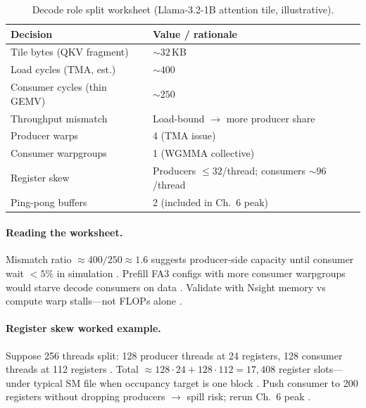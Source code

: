\begin{table}[t]
\centering
\small
\caption{Decode role split worksheet (Llama-3.2-1B attention tile, illustrative).}
\label{tab:ch07_role_worked_example}
\begin{tabular}{@{}ll@{}}
\toprule
\textbf{Decision} & \textbf{Value / rationale} \\
\midrule
Tile bytes (QKV fragment) & ${\sim}32$\,KB \\
Load cycles (TMA, est.) & ${\sim}400$ \\
Consumer cycles (thin GEMV) & ${\sim}250$ \\
Throughput mismatch & Load-bound $\rightarrow$ more producer share \\
Producer warps & 4 (TMA issue) \\
Consumer warpgroups & 1 (WGMMA collective) \\
Register skew & Producers ${\le}32$/thread; consumers ${\sim}96$/thread \\
Ping-pong buffers & 2 (included in Ch.~6 peak) \\
\bottomrule
\end{tabular}
\end{table}

\paragraph{Reading the worksheet.}
Mismatch ratio ${\approx}400/250 \approx 1.6$ suggests producer-side capacity until consumer wait $\lt 5\%$ in simulation \citep{shah2024flashattention3,patel2025llminference}.
Prefill FA3 configs with more consumer warpgroups would starve decode consumers on data \citep{shah2024flashattention3,taxbreak2026}.
Validate with Nsight memory vs compute warp stalls---not FLOPs alone \citep{memoryfloor2026,yirage2026}.

\paragraph{Register skew worked example.}
Suppose 256 threads split: 128 producer threads at 24 registers, 128 consumer threads at 112 registers \citep{shah2024flashattention3,nvidia2022hopper}.
Total ${\approx}128\cdot24 + 128\cdot112 = 17{,}408$ register slots---under typical SM file when occupancy target is one block \citep{nvidia2022hopper,memoryfloor2026}.
Push consumer to 200 registers without dropping producers $\rightarrow$ spill risk; rerun Ch.~6 peak \citep{yirage2026,dao2022flashattention}.

